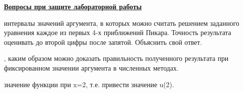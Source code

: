 \underline{\textbf{Вопросы при защите лабораторной работы}}\\

\begin{enumerate}
 интервалы значений аргумента, в которых можно считать решением заданного уравнения каждое из первых 4-х приближений Пикара. Точность результата оценивать до второй цифры после запятой. Объяснить свой ответ.

, каким образом можно доказать правильность полученного результата при фиксированном значении аргумента в численных методах.

 значение функции при x=2, т.е. привести значение u(2).
\end{enumerate}